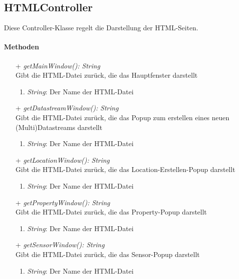 \subsection{HTMLController}
Diese Controller-Klasse regelt die Darstellung der HTML-Seiten.


\paragraph{Methoden}
\begin{itemize}
	\item[+] \textit{ getMainWindow(): String } \\
	Gibt die HTML-Datei zurück, die das Hauptfenster darstellt
	\begin{enumerate}[$\circ$]
		\item \textit{String}: Der Name der HTML-Datei
	\end{enumerate}

	\item[+] \textit{ getDatastreamWindow(): String } \\
	Gibt die HTML-Datei zurück, die das Popup zum erstellen eines neuen (Multi)Datastreams darstellt
	\begin{enumerate}[$\circ$]
		\item \textit{String}: Der Name der HTML-Datei
	\end{enumerate}

	\item[+] \textit{ getLocationWindow(): String } \\
	Gibt die HTML-Datei zurück, die das Location-Erstellen-Popup darstellt
	\begin{enumerate}[$\circ$]
		\item \textit{String}: Der Name der HTML-Datei
	\end{enumerate}

	\item[+] \textit{ getPropertyWindow(): String } \\
	Gibt die HTML-Datei zurück, die das Property-Popup darstellt
	\begin{enumerate}[$\circ$]
		\item \textit{String}: Der Name der HTML-Datei
	\end{enumerate}

	\item[+] \textit{ getSensorWindow(): String } \\
	Gibt die HTML-Datei zurück, die das Sensor-Popup darstellt
	\begin{enumerate}[$\circ$]
		\item \textit{String}: Der Name der HTML-Datei
	\end{enumerate}


\end{itemize}
